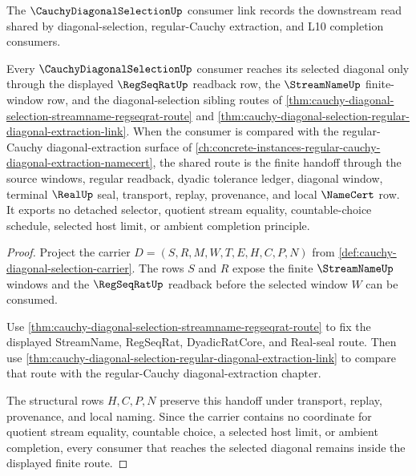 The $\CauchyDiagonalSelectionUp$ consumer link records the downstream read shared by diagonal-selection, regular-Cauchy extraction, and L10 completion consumers.

\begin{theorem}
\label{thm:cauchy-diagonal-selection-consumer-link}
Every $\CauchyDiagonalSelectionUp$ consumer reaches its selected diagonal only through the displayed $\RegSeqRatUp$ readback row, the $\StreamNameUp$ finite-window row, and the diagonal-selection sibling routes of \autoref{thm:cauchy-diagonal-selection-streamname-regseqrat-route} and \autoref{thm:cauchy-diagonal-selection-regular-diagonal-extraction-link}. When the consumer is compared with the regular-Cauchy diagonal-extraction surface of \autoref{ch:concrete-instances-regular-cauchy-diagonal-extraction-namecert}, the shared route is the finite handoff through the source windows, regular readback, dyadic tolerance ledger, diagonal window, terminal $\RealUp$ seal, transport, replay, provenance, and local $\NameCert$ row. It exports no detached selector, quotient stream equality, countable-choice schedule, selected host limit, or ambient completion principle.
\end{theorem}
\begin{proof}
Project the carrier $D=(S,R,M,W,T,E,H,C,P,N)$ from \autoref{def:cauchy-diagonal-selection-carrier}. The rows $S$ and $R$ expose the finite $\StreamNameUp$ windows and the $\RegSeqRatUp$ readback before the selected window $W$ can be consumed.

Use \autoref{thm:cauchy-diagonal-selection-streamname-regseqrat-route} to fix the displayed StreamName, RegSeqRat, DyadicRatCore, and Real-seal route. Then use \autoref{thm:cauchy-diagonal-selection-regular-diagonal-extraction-link} to compare that route with the regular-Cauchy diagonal-extraction chapter.

The structural rows $H,C,P,N$ preserve this handoff under transport, replay, provenance, and local naming. Since the carrier contains no coordinate for quotient stream equality, countable choice, a selected host limit, or ambient completion, every consumer that reaches the selected diagonal remains inside the displayed finite route.
\end{proof}
